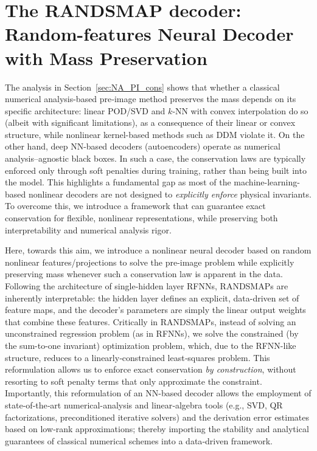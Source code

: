 \documentclass{article}
\begin{document}
\section{The RANDSMAP decoder: Random-features Neural Decoder with Mass Preservation}
\label{sec:decoderRFNN}
The analysis in Section~\ref{sec:NA_PI_cons} shows that whether a classical numerical analysis-based pre‑image method preserves the mass depends on its specific architecture: linear POD/SVD and $k$‑NN with convex interpolation do so (albeit with significant limitations), as a consequence of their linear or convex structure, while nonlinear kernel-based methods such as DDM violate it. On the other hand, deep NN-based decoders (autoencoders) operate as numerical analysis–agnostic black boxes. In such a case, the conservation laws are typically enforced only through soft penalties during training, rather than being built into the model. This highlights a fundamental gap as most of the machine-learning-based nonlinear decoders are not designed to \textit{explicitly enforce} physical invariants. To overcome this, we introduce a framework that can guarantee exact conservation for flexible, nonlinear representations, while preserving both interpretability and numerical analysis rigor.

Here, towards this aim, we introduce a nonlinear neural decoder based on random nonlinear features/projections \cite{rahimi2008uniform,gorban2016approximation,bach2017equivalence,liu2021random,nelsen2021random,surasinghe2021randomized} to solve the pre-image problem while explicitly preserving mass whenever such a conservation law is apparent in the data. Following the architecture of single-hidden layer RFNNs, RANDSMAPs are inherently interpretable: the hidden layer defines an explicit, data-driven set of feature maps, and the decoder’s parameters are simply the linear output weights that combine these features. Critically in RANDSMAPs, instead of solving an unconstrained regression problem (as in RFNNs), we solve the constrained (by the sum-to-one invariant) optimization problem, which, due to the RFNN-like structure, reduces to a linearly‑constrained least‑squares problem. This reformulation allows us to enforce exact conservation \emph{by construction}, without resorting to soft penalty terms that only approximate the constraint. Importantly, this reformulation of an NN-based decoder allows the employment of state‑of‑the‑art numerical-analysis and linear‑algebra tools (e.g., SVD, QR factorizations, preconditioned iterative solvers) and the derivation error estimates based on low‑rank approximations; thereby importing the stability and analytical guarantees of classical numerical schemes into a data‑driven framework.
\end{document}
